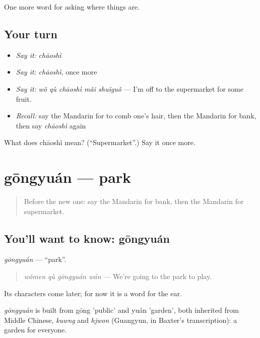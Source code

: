 \begin{grammarlens}[title={What you've built}]
One more word for asking where things are.
\end{grammarlens}

\subsection*{Your turn}
\begin{itemize}
\raggedright
  \item \emph{Say it:} \emph{chāoshì}
  \item \emph{Say it:} \emph{chāoshì}, once more
  \item \emph{Say it:} \emph{wǒ qù chāoshì mǎi shuǐguǒ} — I'm off to the supermarket for some fruit.
  \item \emph{Recall:} say the Mandarin for to comb one's hair, then the Mandarin for bank, then say \emph{chāoshì} again
\end{itemize}

\begin{tcolorbox}[breakable,colback=teal!4,colframe=teal!35!black,title={Before you move on}]
What does chāoshì mean? (\textquotedblleft{}Supermarket\textquotedblright{}.) Say it once more.
\end{tcolorbox}
\section[gōngyuán]{gōngyuán — park}

\label{lesson:ZH-C100-gongyuan}



\begin{quote}
Before the new one: say the Mandarin for bank, then the Mandarin for supermarket.
\end{quote}

\subsection*{You'll want to know: gōngyuán}
\emph{gōngyuán} — \textquotedblleft{}park\textquotedblright{}.

\begin{quote}
\emph{wǒmen qù gōngyuán wán} — We're going to the park to play.
\end{quote}

Its characters come later; for now it is a word for the ear.

\begin{cousinweb}
\emph{gōngyuán} is built from gōng 'public' and yuán 'garden', both inherited from Middle Chinese, \emph{kuwng} and \emph{hjwon} (Guangyun, in Baxter's transcription): a garden for everyone.
\end{cousinweb}

